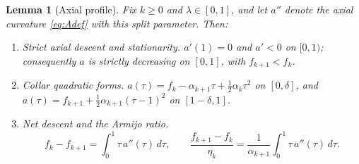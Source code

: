 \documentclass[11pt]{article}
\newtheorem{lemma}[theorem]{Lemma}
\begin{document}
\begin{lemma}[Axial profile]
\label{lem:profile}
Fix $k\ge0$ and $\lambda\in[0,1]$, and let $a''$ denote the axial curvature \eqref{eq:Adef} with this split parameter. Then:
\begin{enumerate}
\item[(i)] \emph{Strict axial descent and stationarity.} $a'(1)=0$ and $a'<0$ on $[0,1)$; consequently $a$ is strictly decreasing on $[0,1]$, with $f_{k+1}<f_k$.
\item[(ii)] \emph{Collar quadratic forms.} $a(\tau)=f_k-\alpha_{k+1}\tau+\tfrac12\alpha_k\tau^2$ on $[0,\delta]$, and $a(\tau)=f_{k+1}+\tfrac12\alpha_{k+1}(\tau-1)^2$ on $[1-\delta,1]$.
\item[(iii)] \emph{Net descent and the Armijo ratio.}
\begin{equation}
\label{eq:rhocentroid}
f_k-f_{k+1}=\int_0^1\tau\,a''(\tau)\,d\tau, \qquad
\frac{f_{k+1}-f_k}{\eta_k} = \frac1{\alpha_{k+1}}\int_0^1\tau\,a''(\tau)\,d\tau.
\end{equation}
\end{enumerate}
\end{lemma}
\end{document}
